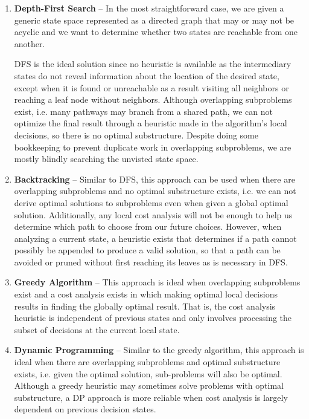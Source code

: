\documentclass{article}
\begin{document}
    \begin{enumerate}
        \item \textbf{Depth-First Search} --
        In the most straightforward case, we are given a generic state space represented as a directed graph that may or may not be acyclic and we want to determine  whether two states are reachable from one another. 
        
        DFS is the ideal solution since no heuristic is available as the intermediary states do not reveal information about the location of the desired state, except when it is found or unreachable as a result visiting all neighbors or reaching a leaf node without neighbors. Although overlapping subproblems exist, i.e. many pathways may branch from a shared path, we can not optimize the final result through a heuristic made in the algorithm's local decisions, so there is no optimal substructure. Despite doing some bookkeeping to prevent duplicate work in overlapping subproblems, we are mostly blindly searching the unvisted state space.
        
        \item \textbf{Backtracking} -- Similar to DFS, this approach can be used when there are overlapping subproblems and no optimal substructure exists, i.e. we can not derive optimal solutions to subproblems even when given a global optimal solution. Additionally, any local cost analysis will not be enough to help us determine which path to choose from our future choices. However, when analyzing a current state, a heuristic exists that determines if a path cannot possibly be appended to produce a valid solution, so that a path can be avoided or pruned without first reaching its leaves as is necessary in DFS.
        
        \item \textbf{Greedy Algorithm} -- This approach is ideal when overlapping subproblems exist and a cost analysis exists in which making optimal local decisions results in finding the globally optimal result. That is, the cost analysis heuristic is independent of previous states and only involves processing the subset of decisions at the current local state.

        \item \textbf{Dynamic Programming} --  Similar to the greedy algorithm, this approach is ideal when there are overlapping subproblems and optimal substructure exists, i.e. given the optimal solution, sub-problems will also be optimal. Although a greedy heuristic may sometimes solve problems with optimal substructure, a DP approach is more reliable when cost analysis is largely dependent on previous decision states.
    \end{enumerate}
    
\end{document}
